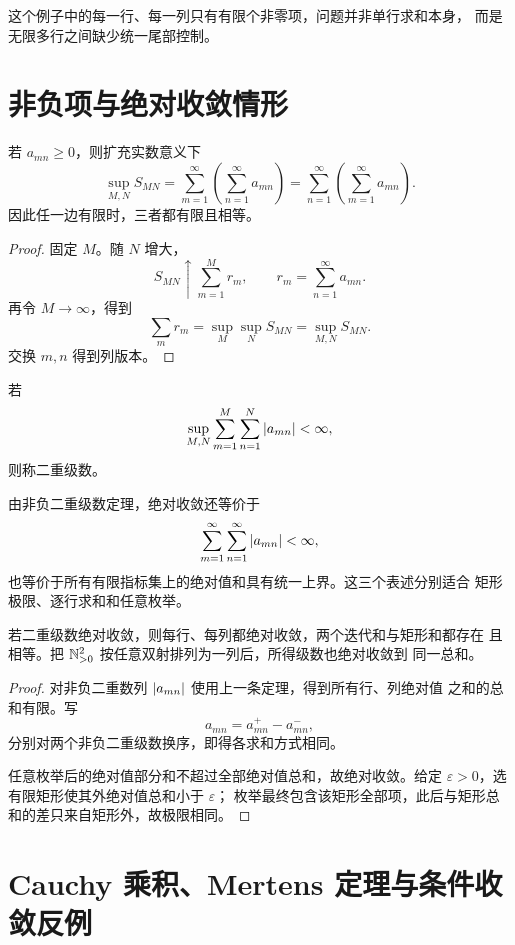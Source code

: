 这个例子中的每一行、每一列只有有限个非零项，问题并非单行求和本身，
而是无限多行之间缺少统一尾部控制。

\section{非负项与绝对收敛情形}

\begin{theorem}[非负二重级数]
\label{thm:double-series-nonnegative}
若 \(a_{mn}\ge0\)，则扩充实数意义下
\[
 \sup_{M,N}S_{MN}
 =\sum_{m=1}^\infty\left(\sum_{n=1}^\infty a_{mn}\right)
 =\sum_{n=1}^\infty\left(\sum_{m=1}^\infty a_{mn}\right).
\]
因此任一边有限时，三者都有限且相等。
\end{theorem}

\begin{proof}
固定 \(M\)。随 \(N\) 增大，
\[
 S_{MN}\uparrow\sum_{m=1}^M r_m,
\qquad
 r_m=\sum_{n=1}^\infty a_{mn}.
\]
再令 \(M\to\infty\)，得到
\[
 \sum_m r_m=\sup_M\sup_N S_{MN}=\sup_{M,N}S_{MN}.
\]
交换 \(m,n\) 得到列版本。
\end{proof}

\begin{definition}
若
\[
 \sup_{M,N}\sum_{m=1}^M\sum_{n=1}^N\left|a_{mn}\right|<\infty,
\]
则称二重级数。
\end{definition}

由非负二重级数定理，绝对收敛还等价于
\[
 \sum_{m=1}^{\infty}\sum_{n=1}^{\infty}\left|a_{mn}\right|<\infty,
\]
也等价于所有有限指标集上的绝对值和具有统一上界。这三个表述分别适合
矩形极限、逐行求和和任意枚举。

\begin{theorem}[绝对收敛下的换序]
\label{thm:double-series-absolute-fubini}
若二重级数绝对收敛，则每行、每列都绝对收敛，两个迭代和与矩形和都存在
且相等。把 \(\mathbb{N}_{>0}^2\) 按任意双射排列为一列后，所得级数也绝对收敛到
同一总和。
\end{theorem}

\begin{proof}
对非负二重数列 \(\left|a_{mn}\right|\) 使用上一条定理，得到所有行、列绝对值
之和的总和有限。写
\[
 a_{mn}=a_{mn}^+-a_{mn}^-,
\]
分别对两个非负二重级数换序，即得各求和方式相同。

任意枚举后的绝对值部分和不超过全部绝对值总和，故绝对收敛。给定
\(\varepsilon>0\)，选有限矩形使其外绝对值总和小于 \(\varepsilon\)；
枚举最终包含该矩形全部项，此后与矩形总和的差只来自矩形外，故极限相同。
\end{proof}

\section{Cauchy 乘积、Mertens 定理与条件收敛反例}

